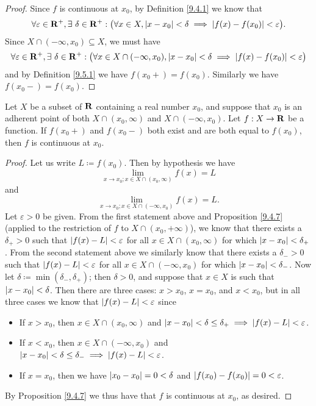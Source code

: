 \begin{proof}
    Since \(f\) is continuous at \(x_0\), by Definition \ref{9.4.1} we know that
    \[
        \forall \varepsilon \in \mathbf{R}^+, \exists\ \delta \in \mathbf{R}^+ : \big(\forall x \in X, \left\lvert x - x_0\right\rvert < \delta \implies \left\lvert f(x) - f(x_0)\right\rvert < \varepsilon\big).
    \]
    Since \(X \cap (-\infty, x_0) \subseteq X\), we must have
    \[
        \forall \varepsilon \in \mathbf{R}^+, \exists\ \delta \in \mathbf{R}^+ : \big(\forall x \in X \cap (-\infty, x_0), \left\lvert x - x_0\right\rvert < \delta \implies \left\lvert f(x) - f(x_0)\right\rvert < \varepsilon\big)
    \]
    and by Definition \ref{9.5.1} we have \(f(x_0+) = f(x_0)\).
    Similarly we have \(f(x_0-) = f(x_0)\).
\end{proof}

\setcounter{theorem}{2}
\begin{proposition}\label{9.5.3}
    Let \(X\) be a subset of \(\mathbf{R}\) containing a real number \(x_0\), and suppose that \(x_0\) is an adherent point of both \(X \cap (x_0, \infty)\) and \(X \cap (-\infty, x_0)\).
    Let \(f : X \to \mathbf{R}\) be a function.
    If \(f(x_0+)\) and \(f(x_0-)\) both exist and are both equal to \(f(x_0)\), then \(f\) is continuous at \(x_0\).
\end{proposition}

\begin{proof}
    Let us write \(L \coloneqq f(x_0)\).
    Then by hypothesis we have
    \[
        \lim_{x \to x_0 ; x \in X \cap (x_0, \infty)} f(x) = L
    \]
    and
    \[
        \lim_{x \to x_0 ; x \in X \cap (-\infty, x_0)} f(x) = L.
    \]
    Let \(\varepsilon > 0\) be given.
    From the first statement above and Proposition \ref{9.4.7} (applied to the restriction of \(f\) to \(X \cap (x_0, +\infty)\)), we know that there exists a \(\delta_+ > 0\) such that \(\left\lvert f(x) - L\right\rvert < \varepsilon\) for all \(x \in X \cap(x_0, \infty)\) for which \(\left\lvert x - x_0\right\rvert < \delta_+\).
    From the second statement above we similarly know that there exists a \(\delta_- > 0\) such that \(\left\lvert f(x) - L\right\rvert < \varepsilon\) for all \(x \in X \cap (-\infty, x_0)\) for which \(\left\lvert x - x_0\right\rvert < \delta_-\).
    Now let \(\delta \coloneqq \min(\delta_-, \delta_+)\);
    then \(\delta > 0\), and suppose that \(x \in X\) is such that \(\left\lvert x - x_0\right\rvert < \delta\).
    Then there are three cases:
    \(x > x_0\), \(x = x_0\), and \(x < x_0\), but in all three cases we know that \(\left\lvert f(x) - L\right\rvert < \varepsilon\) since
    \begin{itemize}
        \item If \(x > x_0\), then \(x \in X \cap (x_0, \infty)\) and \(\left\lvert x - x_0\right\rvert < \delta \leq \delta_+ \implies \left\lvert f(x) - L\right\rvert < \varepsilon\).
        \item If \(x < x_0\), then \(x \in X \cap (-\infty, x_0)\) and \(\left\lvert x - x_0\right\rvert < \delta \leq \delta_- \implies \left\lvert f(x) - L\right\rvert < \varepsilon\).
        \item If \(x = x_0\), then we have \(\left\lvert x_0 - x_0\right\rvert = 0 < \delta\) and \(\left\lvert f(x_0) - f(x_0)\right\rvert = 0 < \varepsilon\).
    \end{itemize}
    By Proposition \ref{9.4.7} we thus have that \(f\) is continuous at \(x_0\), as desired.
\end{proof}

